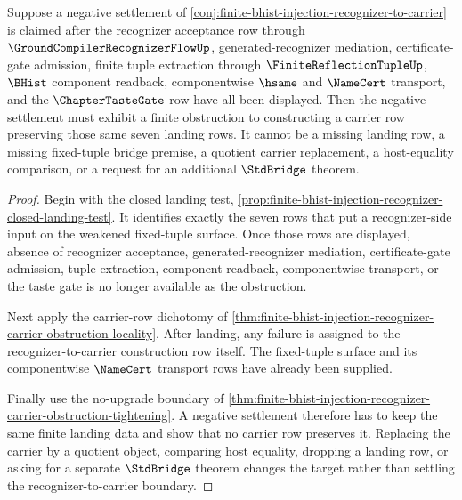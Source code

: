 \begin{theorem}
\label{thm:finite-bhist-injection-carrier-map-constructive-obstruction}
Suppose a negative settlement of \autoref{conj:finite-bhist-injection-recognizer-to-carrier} is claimed after the recognizer acceptance row through $\GroundCompilerRecognizerFlowUp$, generated-recognizer mediation, certificate-gate admission, finite tuple extraction through $\FiniteReflectionTupleUp$, $\BHist$ component readback, componentwise $\hsame$ and $\NameCert$ transport, and the $\ChapterTasteGate$ row have all been displayed. Then the negative settlement must exhibit a finite obstruction to constructing a carrier row preserving those same seven landing rows. It cannot be a missing landing row, a missing fixed-tuple bridge premise, a quotient carrier replacement, a host-equality comparison, or a request for an additional $\StdBridge$ theorem.
\end{theorem}
\begin{proof}
Begin with the closed landing test, \autoref{prop:finite-bhist-injection-recognizer-closed-landing-test}. It identifies exactly the seven rows that put a recognizer-side input on the weakened fixed-tuple surface. Once those rows are displayed, absence of recognizer acceptance, generated-recognizer mediation, certificate-gate admission, tuple extraction, component readback, componentwise transport, or the taste gate is no longer available as the obstruction.

Next apply the carrier-row dichotomy of \autoref{thm:finite-bhist-injection-recognizer-carrier-obstruction-locality}. After landing, any failure is assigned to the recognizer-to-carrier construction row itself. The fixed-tuple surface and its componentwise $\NameCert$ transport rows have already been supplied.

Finally use the no-upgrade boundary of \autoref{thm:finite-bhist-injection-recognizer-carrier-obstruction-tightening}. A negative settlement therefore has to keep the same finite landing data and show that no carrier row preserves it. Replacing the carrier by a quotient object, comparing host equality, dropping a landing row, or asking for a separate $\StdBridge$ theorem changes the target rather than settling the recognizer-to-carrier boundary.
\end{proof}

